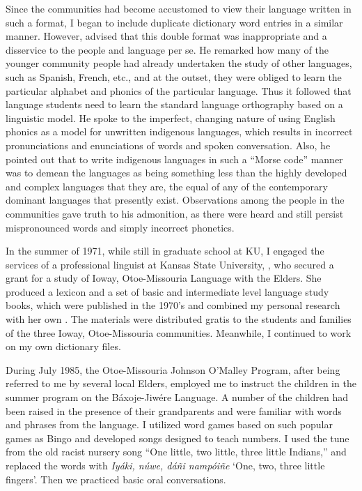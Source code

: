\documentclass[output=paper]{LSP/langsci}
\begin{document}
Since the communities had become accustomed to view their language written in such a format, I began to include duplicate dictionary word entries in a similar manner. However,  advised that this double format was inappropriate and a disservice to the people and language per se. He remarked how many of the younger community people had already undertaken the study of other languages, such as Spanish, French, etc., and at the outset, they were obliged to learn the particular alphabet and phonics of the particular language. Thus it followed that language students need to learn the standard language orthography based on a linguistic model. He spoke to the imperfect, changing nature of using English phonics as a model for unwritten indigenous languages, which results in incorrect pronunciations and enunciations of words and spoken conversation. Also, he pointed out that to write indigenous languages in such a ``Morse code'' manner was to demean the languages as being something less than the highly developed and complex languages that they are, the equal of any of the contemporary dominant languages that presently exist. Observations among the people in the communities gave truth to his admonition, as there were heard and still persist mispronounced words and simply incorrect phonetics. 

In the summer of 1971, while still in graduate school at KU, I engaged the services of a professional linguist at Kansas State University, , who secured a grant for a study of Ioway, Otoe-Missouria Language with the Elders. She produced a lexicon and a set of basic and intermediate level language study books, which were published in the 1970's and combined my personal research with her own \citep{OtoeIowaWistrandRobinson1977, OtoeIowaWistrandRobinson1978}. The materials were distributed gratis to the students and families of the three Ioway, Otoe-Missouria communities. Meanwhile, I continued to work on my own dictionary files.  

During July 1985, the Otoe-Missouria Johnson O'Malley Program, after being referred to me by several local Elders, employed me to instruct the children in the summer program on the Báxoje-Jiwére Language. A number of the children had been raised in the presence of their grandparents and were familiar with words and phrases from the language. I utilized word games based on such popular games as Bingo and developed songs designed to teach numbers. I used the tune from the old racist nursery song ``One little, two little, three little Indians,'' and replaced the words with \emph{Iyáki, núwe, dáñi nampóiñe} `One, two, three little fingers'. Then we practiced basic oral conversations.  
\end{document}
